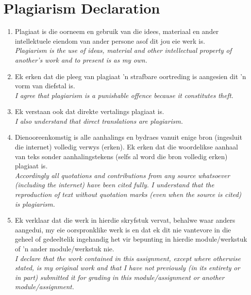 \documentclass[a4paper,12pt]{report}
\begin{document}
\chapter*{Plagiarism Declaration}
\begin{enumerate}
\item Plagiaat is die oorneem en gebruik van die idees, materiaal en ander intellektuele eiendom van ander persone asof dit jou eie werk is.\\
\textit{Plagiarism is the use of ideas, material and other intellectual property of another's work and to present is as my own.}
\item Ek erken dat die pleeg van plagiaat 'n strafbare oortreding is aangesien dit 'n vorm van diefstal is. \\
\textit{I agree that plagiarism is a punishable offence because it constitutes theft.}
\item Ek verstaan ook dat direkte vertalings plagiaat is.\\
\textit{I also understand that direct translations are plagiarism.}
\item Dienooreenkomstig is alle aanhalings en bydraes vanuit enige bron (ingesluit die internet) volledig verwys (erken). Ek erken dat die woordelikse aanhaal van teks sonder aanhalingstekens (selfs al word die bron volledig erken) plagiaat is.\\
\textit{Accordingly all quotations and contributions from any source whatsoever (including the internet) have been cited fully. I understand that the reproduction of text without quotation marks (even when the source is cited) is plagiarism.}
\item Ek verklaar dat die werk in hierdie skryfstuk vervat, behalwe waar anders aangedui, my eie oorspronklike werk is en dat ek dit nie vantevore in die geheel of gedeeltelik ingehandig het vir bepunting in hierdie module/werkstuk of 'n ander module/werkstuk nie.\\
\textit{I declare that the work contained in this assignment, except where otherwise stated, is my original work and that I have not previously (in its entirety or in part) submitted it for grading in this module/assignment or another module/assignment.}
\end{enumerate}
\vspace{1cm}
\end{document}
